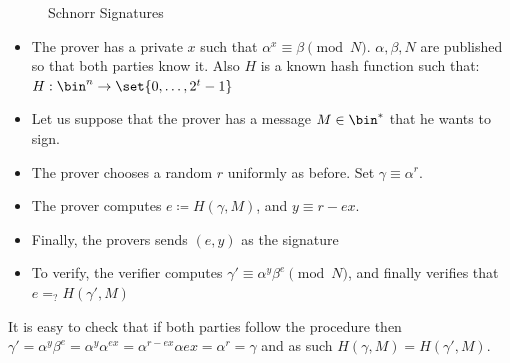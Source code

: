 \documentclass{article}
\begin{document}
\begin{figure}[H]
    \centering
    \caption{Schnorr Signatures}
    \label{schnorrsig}
\end{figure}

\begin{itemize}
    \item The prover has a private $x$ such that $\alpha^x \equiv \beta \pmod N$. $\alpha, \beta, N$
          are published so that both parties know it. Also $H$ is a known hash function such that: $H: \bin^n \to \set{0, \dots, 2^t - 1}$
    \item Let us suppose that the prover has a message $M \in \bin^*$ that he wants to sign.
    \item The prover chooses a random $r$ uniformly as before. Set $\gamma \equiv \alpha^r$.
    \item The prover computes $e \coloneqq H(\gamma, M)$, and $y \equiv r - ex$.
    \item Finally, the provers sends $(e, y)$ as the signature
    \item To verify, the verifier computes $\gamma' \equiv \alpha^y \beta^e \pmod N$, and finally
          verifies that $e =_? H(\gamma', M)$
\end{itemize}

It is easy to check that if both parties follow the procedure then
$\gamma' = \alpha^y \beta ^e = \alpha^y \alpha^{ex} = \alpha^{r - ex} \alpha{ex} = \alpha^r = \gamma$
and as such $H(\gamma, M) = H(\gamma', M)$.
\end{document}
